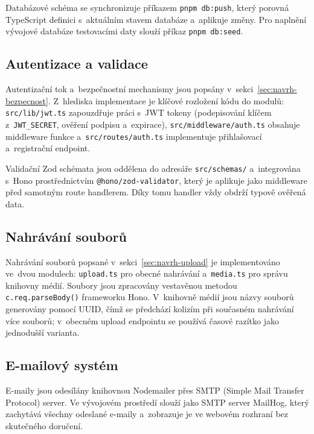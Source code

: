 Databázové schéma se synchronizuje příkazem \texttt{pnpm db:push}, který porovná TypeScript definici s~aktuálním stavem databáze a~aplikuje změny. Pro naplnění vývojové databáze testovacími daty slouží příkaz \texttt{pnpm db:seed}.

\subsection{Autentizace a validace}

Autentizační tok a~bezpečnostní mechanismy jsou popsány v~sekci~\ref{sec:navrh-bezpecnost}. Z~hlediska implementace je klíčové rozložení kódu do modulů: \texttt{src/lib/jwt.ts} zapouzdřuje práci s~JWT tokeny (podepisování klíčem z~\texttt{JWT\_SECRET}, ověření podpisu a~expirace), \texttt{src/middleware/auth.ts} obsahuje middleware funkce a~\texttt{src/routes/auth.ts} implementuje přihlašovací a~registrační endpoint.

Validační Zod schémata jsou oddělena do adresáře \texttt{src/schemas/} a~integrována s~Hono prostřednictvím \texttt{@hono/zod-validator}, který je aplikuje jako middleware před samotným route handlerem. Díky tomu handler vždy obdrží typově ověřená data.

\subsection{Nahrávání souborů}

\begin{sloppypar}
Nahrávání souborů popsané v~sekci~\ref{sec:navrh-upload} je implementováno ve~dvou modulech: \texttt{upload.ts} pro obecné nahrávání a~\texttt{media.ts} pro správu knihovny médií. Soubory jsou zpracovány vestavěnou metodou \texttt{c.req.\allowbreak parseBody()} frameworku Hono. V~knihovně médií jsou názvy souborů generovány pomocí UUID, čímž se předchází kolizím při současném nahrávání více souborů; v~obecném upload endpointu se používá časové razítko jako jednodušší varianta.
\end{sloppypar}

\subsection{E-mailový systém}

E-maily jsou odesílány knihovnou Nodemailer přes SMTP (Simple Mail Transfer Protocol) server. Ve vývojovém prostředí slouží jako SMTP server MailHog, který zachytává všechny odeslané e-maily a~zobrazuje je ve webovém rozhraní bez skutečného doručení.

